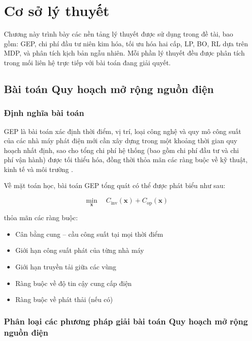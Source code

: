 \chapter{Cơ sở lý thuyết}

Chương này trình bày các nền tảng lý thuyết được sử dụng trong đề tài, bao gồm: GEP, chi phí đầu tư niên kim hóa, tối ưu hóa hai cấp, LP, BO, RL dựa trên MDP, và phân tích kịch bản ngẫu nhiên. Mỗi phần lý thuyết đều được phân tích trong mối liên hệ trực tiếp với bài toán đang giải quyết.

\section{Bài toán Quy hoạch mở rộng nguồn điện}

\subsection{Định nghĩa bài toán}

GEP là bài toán xác định thời điểm, vị trí, loại công nghệ và quy mô công suất của các nhà máy phát điện mới cần xây dựng trong một khoảng thời gian quy hoạch nhất định, sao cho tổng chi phí hệ thống (bao gồm chi phí đầu tư và chi phí vận hành) được tối thiểu hóa, đồng thời thỏa mãn các ràng buộc về kỹ thuật, kinh tế và môi trường \cite{koltsaklis2018gep}.

Về mặt toán học, bài toán GEP tổng quát có thể được phát biểu như sau:

\begin{equation}
    \min_{\mathbf{x}} \quad C_{\text{inv}}(\mathbf{x}) + C_{\text{op}}(\mathbf{x})
    \label{eq:gep_general}
\end{equation}

\noindent thỏa mãn các ràng buộc:
\begin{itemize}
    \item Cân bằng cung -- cầu công suất tại mọi thời điểm
    \item Giới hạn công suất phát của từng nhà máy
    \item Giới hạn truyền tải giữa các vùng
    \item Ràng buộc về độ tin cậy cung cấp điện
    \item Ràng buộc về phát thải (nếu có)
\end{itemize}

\subsection{Phân loại các phương pháp giải bài toán Quy hoạch mở rộng nguồn điện}

